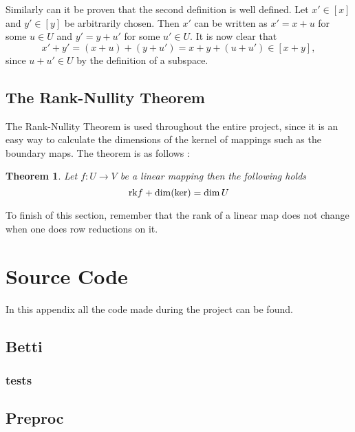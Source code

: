 \documentclass[11pt,a4paper,twoside]{report}
\newtheorem{mythm}{Theorem}[chapter]
\begin{document}
Similarly can it be proven that the second definition is well defined. Let $x'\in[x]$ and $y'\in [y]$ be arbitrarily chosen. Then $x'$ can be written as $x'=x+u$ for some $u\in U$ and $y' = y+u'$ for some $u'\in U$. It is now clear that
\begin{equation*}
x'+y'=(x+u)+(y+u')=x+y+(u+u')\in [x+y],
\end{equation*}
since $u+u'\in U$ by the definition of a subspace.


\section{The Rank-Nullity Theorem}
The Rank-Nullity Theorem is used throughout the entire project, since it is an easy way to calculate the dimensions of the kernel of mappings such as the boundary maps. The theorem is as follows \cite[p. 109]{LinAlg}: 
\begin{mythm}\label{thm:rank_nullity}
Let $f:U\to V$ be a linear mapping then the following holds
\begin{equation*}
\textnormal{rk}f+\dim(\ker)=\dim U
\end{equation*}
\end{mythm}

To finish of this section, remember that the rank of a linear map does not change when one does row reductions on it.

\chapter{Source Code}\label{ch:source_code}
In this appendix all the code made during the project can be found.
\section{Betti}








\subsection{tests}




\section{Preproc}

\end{document}
